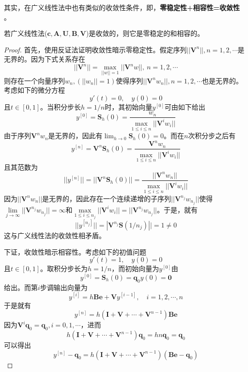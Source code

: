 其实，在广义线性法中也有类似的收敛性条件，即，\textbf{零稳定性+相容性=收敛性 }。
\begin{theorem}
若广义线性法($\bm{c},\bm{A},\bm{U},\bm{B},\bm{V}$)是收敛的，则它是零稳定的和相容的。
\end{theorem}
\begin{proof}
首先，使用反证法证明收敛性暗示零稳定性。假定序列$||\bm{V}^n||,n=1,2,\cdots$是无界的。因为下式关系存在
\begin{equation}
||\bm{V}^n||=\max_{||w||=1}||\bm{V}^nw||,\ n=1,2,\cdots
\end{equation}
则存在一个向量序列$w_n,(||w_n||=1)$使得序列$||\bm{V}^nw_n||,n=1,2,\cdots$也是无界的。考虑如下的微分方程
\begin{equation}
y'(t)=0,\quad y(0)=0
\end{equation}
且$t\in[0,1]$。当积分步长$h=1/n$时，其初始向量$y^{[0]}$可由如下给出
\begin{equation}
y^{[0]}=\bm{S}_h(0)=\frac{w_n}{\max\limits_{1\le i\le n}||\bm{V}^iw_i||}
\end{equation}
由于序列$\bm{V}^nw_n$是无界的，因此有$\lim_{h\to0}\bm{S}_h(0)=0$。而在$n$次积分步之后有
\begin{equation}
y^{[n]}=\bm{V}^n\bm{S}_h(0)=\frac{\bm{V}^nw_n}{\max\limits_{1\le i\le n}||\bm{V}^iw_i||}
\end{equation}
且其范数为
\begin{equation}
||y^{[n]}||=||\bm{V}^n\bm{S}_h(0)||=\frac{||\bm{V}^nw_n||}{\max\limits_{1\le i\le n}||\bm{V}^iw_i||}
\end{equation}
因为$||\bm{V}^nw_n||$是无界的，因此存在一个连续递增的子序列$||\bm{V}^{n_j}w_{n_j}||$使得$\lim\limits_{j\to\infty}||\bm{V}^{n_j}w_{n_j}||=\infty$和$\max\limits_{1\le i\le n_j}||\bm{V}^iw_i||=||\bm{V}^{n_j}w_{n_j}||$。于是，就有
\begin{equation}
||y^{[n_j]}||=|\bm{V}^{n_j}\bm{S}(1/n_j)||=1\neq 0
\end{equation}
这与广义线性法的收敛性相矛盾。

下证，收敛性暗示相容性。考虑如下的初值问题
\begin{equation}
y'(t)=1,\quad y(0)=0
\end{equation}
且$t\in[0,1]$。取积分步长为$h=1/n$，而初始向量为$y^{[0]}$由
\begin{equation}
y^{[0]}=\bm{S}_h(0)=\bm{q}_0y(0)=\bm{0}
\end{equation}
给出。而第$i$步调输出向量为
\begin{equation}
y^{[i]}=h\bm{Be}+\bm{V}y^{[i-1]},\quad i=1,2,\cdots,n
\end{equation}
于是就有
\begin{equation}
y^{[n]}=h(\bm{I}+\bm{V}+\cdots+\bm{V}^{n-1})\bm{Be}
\end{equation}
因为$\bm{V}^i\bm{q}_0=\bm{q}_0,i=0,1,\cdots$，进而
\begin{equation}
h(\bm{I}+\bm{V}+\cdots+\bm{V}^{n-1})\bm{q}_0=hn\bm{q}_0=\bm{q}_0
\end{equation}
可以得出
\begin{equation}
y^{[n]}-\bm{q}_0=h(\bm{I}+\bm{V}+\cdots+\bm{V}^{n-1})(\bm{Be}-\bm{q}_0)
\end{equation}


\end{proof}
